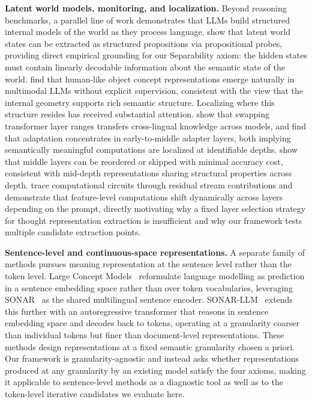 \textbf{Latent world models, monitoring, and localization.}
Beyond reasoning benchmarks, a parallel line of work demonstrates that LLMs build structured internal models of the world as they process language. \citet{feng2025monitoring} show that latent world states can be extracted as structured propositions via propositional probes, providing direct empirical grounding for our Separability axiom: the hidden states must contain linearly decodable information about the semantic state of the world. \citet{Du_2025} find that human-like object concept representations emerge naturally in multimodal LLMs without explicit supervision, consistent with the view that the internal geometry supports rich semantic structure. Localizing where this structure resides has received substantial attention. \citet{bandarkar2025layerswappingzeroshotcrosslingual} show that swapping transformer layer ranges transfers cross-lingual knowledge across models, and \citet{alabi-etal-2024-hidden} find that adaptation concentrates in early-to-middle adapter layers, both implying semantically meaningful computations are localized at identifiable depths. \citet{sun2025transformerlayerspainters} show that middle layers can be reordered or skipped with minimal accuracy cost, consistent with mid-depth representations sharing structural properties across depth. \citet{ameisen2025circuit} trace computational circuits through residual stream contributions and demonstrate that feature-level computations shift dynamically across layers depending on the prompt, directly motivating why a fixed layer selection strategy for thought representation extraction is insufficient and why our framework tests multiple candidate extraction points.

\textbf{Sentence-level and continuous-space representations.}
A separate family of methods pursues meaning representation at the sentence level rather than the token level. Large Concept Models~\citep{lcm2024} reformulate language modelling as prediction in a sentence embedding space rather than over token vocabularies, leveraging SONAR~\citep{duquenne2023sonarsentencelevelmultimodallanguageagnostic} as the shared multilingual sentence encoder. SONAR-LLM~\citep{dragunov2025sonarllm} extends this further with an autoregressive transformer that reasons in sentence embedding space and decodes back to tokens, operating at a granularity coarser than individual tokens but finer than document-level representations. These methods design representations at a fixed semantic granularity chosen a priori. Our framework is granularity-agnostic and instead asks whether representations produced at any granularity by an existing model satisfy the four axioms, making it applicable to sentence-level methods as a diagnostic tool as well as to the token-level iterative candidates we evaluate here.
